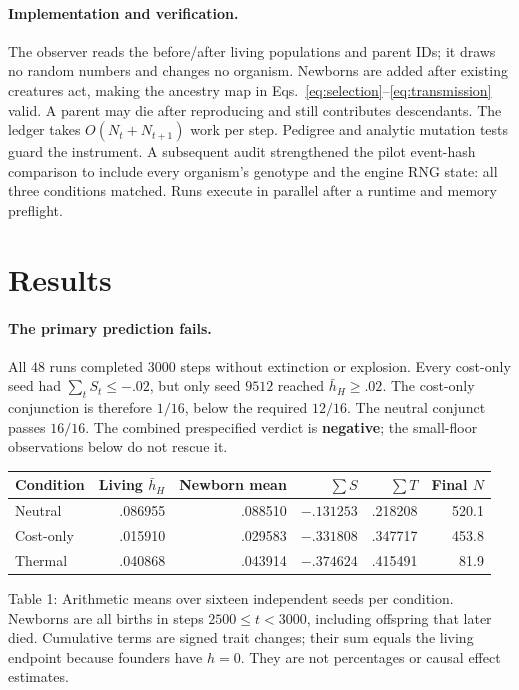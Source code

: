 \documentclass[10pt]{article}
\begin{document}
\paragraph{Implementation and verification.}
The observer reads the before/after living populations and parent IDs; it draws no random numbers and changes no organism. Newborns are added after existing creatures act, making the ancestry map in Eqs.~\eqref{eq:selection}--\eqref{eq:transmission} valid. A parent may die after reproducing and still contributes descendants. The ledger takes $O(N_t+N_{t+1})$ work per step. Pedigree and analytic mutation tests guard the instrument. A subsequent audit strengthened the pilot event-hash comparison to include every organism's genotype and the engine RNG state: all three conditions matched. Runs execute in parallel after a runtime and memory preflight.

\newpage
\section{Results}
\paragraph{The primary prediction fails.}
All $48$ runs completed $3000$ steps without extinction or explosion. Every cost-only seed had $\sum_tS_t\le-.02$, but only seed $9512$ reached $\bar h_H\ge .02$. The cost-only conjunction is therefore $1/16$, below the required $12/16$. The neutral conjunct passes $16/16$. The combined prespecified verdict is \textbf{negative}; the small-floor observations below do not rescue it.

\begin{center}\small
\begin{tabular}{lrrrrr}
\toprule
Condition & Living $\bar h_H$ & Newborn mean & $\sum S$ & $\sum T$ & Final $N$\\
\midrule
Neutral & .086955 & .088510 & $-.131253$ & .218208 & 520.1\\
Cost-only & .015910 & .029583 & $-.331808$ & .347717 & 453.8\\
Thermal & .040868 & .043914 & $-.374624$ & .415491 & 81.9\\
\bottomrule
\end{tabular}
\end{center}
\noindent Table 1: Arithmetic means over sixteen independent seeds per condition. Newborns are all births in steps $2500\le t<3000$, including offspring that later died. Cumulative terms are signed trait changes; their sum equals the living endpoint because founders have $h=0$. They are not percentages or causal effect estimates.
\end{document}
